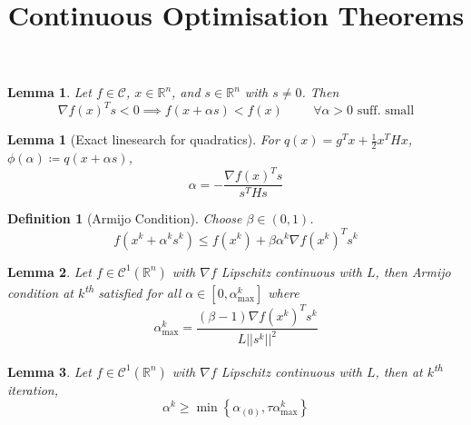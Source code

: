 \documentclass[a4paper]{article}
\title{Continuous Optimisation Theorems}
\author{}
\date{}
\newcommand{\R}{\mathbb{R}}
\newcommand{\C}{\mathcal{C}}
\newcommand{\norm}[1]{\lvert \lvert #1 \rvert \rvert}
\newtheorem{lemma}{Lemma}
\newtheorem*{lemma*}{Lemma}
\newtheorem*{definition*}{Definition}
\begin{document}
\maketitle

\begin{lemma}
    Let $f \in \C$, $x \in \R^n$, and $s \in \R^n$ with $s \neq 0$. Then
    \begin{equation*}
        \nabla f(x)^T s < 0 \implies f (x + \alpha s) < f(x) \hspace{1cm} \forall \alpha>0 \text{ suff. small}
    \end{equation*}
\end{lemma}

\begin{lemma*}[Exact linesearch for quadratics]
    For $q(x) = g^T x + \frac{1}{2} x^T H x$, $\phi (\alpha) \coloneqq q ( x + \alpha s )$,
   \begin{equation*}
       \alpha = - \frac{\nabla f(x)^T s}{s^T H s}
   \end{equation*}
\end{lemma*}

\begin{definition*}[Armijo Condition]
    Choose $\beta \in \left( 0, 1 \right)$.
    \begin{equation*}
        f\left( x^k + \alpha^k s^k \right) \leq f\left( x^k \right) + \beta \alpha^k \nabla f\left( x^k \right)^T s^k
    \end{equation*}
\end{definition*}

\begin{lemma}
    Let $f \in \C^1 \left( \R^n \right)$ with $\nabla f$ Lipschitz continuous with $L$, then Armijo condition at $k$\textsuperscript{th} satisfied for all $\alpha \in \left[ 0, \alpha_{\max}^k \right]$ where
    \begin{equation*}
        \alpha_{\max}^{k} = \frac{\left( \beta - 1 \right) \nabla f \left( x^k \right)^T s^k}{L \norm{s^k}^2}
    \end{equation*}
\end{lemma}

\begin{lemma}
    Let $f \in \C^1 \left( \R^n \right)$ with $\nabla f$ Lipschitz continuous with $L$, then at $k$\textsuperscript{th} iteration,
    \begin{equation*}
        \alpha^k \geq \min \left\{ \alpha_{(0)}, \tau \alpha_{\max}^k \right\}
    \end{equation*}
\end{lemma}
\end{document}
